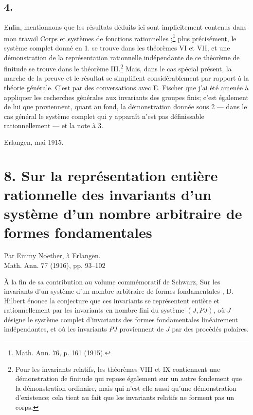 \subsection*{4.}
Enfin, mentionnons que les résultats déduits ici sont implicitement contenus dans mon travail \og{} Corps et systèmes de fonctions rationnelles \fg{};\footnote{Math. Ann. 76, p. 161 (1915).} plus précisément, le système complet donné en 1. se trouve dans les théorèmes VI et VII, et une démonstration de la représentation rationnelle indépendante de ce théorème de finitude se trouve dans le théorème III.\footnote{Pour les invariants relatifs, les théorèmes VIII et IX contiennent une démonstration de finitude qui repose également sur un autre fondement que la démonstration ordinaire, mais qui n'est elle aussi qu'une démonstration d'existence; cela tient au fait que les invariants relatifs ne forment pas un corps.} Mais, dans le cas spécial présent, la marche de la preuve et le résultat se simplifient considérablement par rapport à la théorie générale. C'est par des conversations avec E. Fischer que j'ai été amenée à appliquer les recherches générales aux invariants des groupes finis; c'est également de lui que proviennent, quant au fond, la démonstration donnée sous 2 --- dans le cas général le système complet qui y apparaît n'est pas définissable rationnellement --- et la note à 3.

Erlangen, mai 1915.

\clearpage
\setcounter{footnote}{0}
\section*{8. Sur la représentation entière rationnelle des invariants d'un système d'un nombre arbitraire de formes fondamentales}
\begin{center}
Par Emmy Noether, à Erlangen.\\[0.75em]
Math. Ann. 77 (1916), pp. 93--102
\end{center}

À la fin de sa contribution au volume commémoratif de Schwarz, \og{} Sur les invariants d'un système d'un nombre arbitraire de formes fondamentales \fg{}, D. Hilbert énonce la conjecture que ces invariants se représentent entière et rationnellement par les invariants en nombre fini du système $(J,PJ)$, où $J$ désigne le système complet d'invariants des formes fondamentales linéairement indépendantes, et où les invariants $PJ$ proviennent de $J$ par des procédés polaires.

